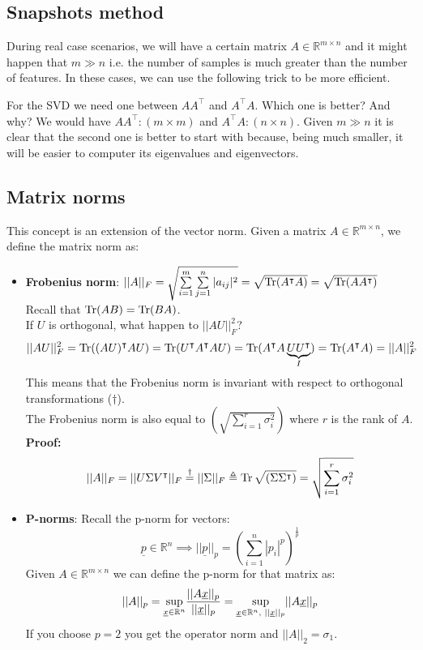 \subsection*{Snapshots method}
During real case scenarios, we will have a certain matrix $A \in \mathbb{R}^{m\times n}$ and it might happen that $m \gg n$ i.e. the number of samples is much greater than the number of features. In these cases, we can use the following trick to be more efficient.

For the SVD we need one between  $AA^\intercal$ and $A^\intercal A$. Which one is better? And why?
We would have $AA^\intercal: (m\times m)$ and $A^\intercal A: (n\times n)$. Given $m \gg n$ it is clear that the second one is better to start with because, being much smaller, it will be easier to computer its eigenvalues and eigenvectors.    


\subsection*{Matrix norms}
This concept is an extension of the vector norm. Given a matrix $A \in \mathbb{R}^{m\times n}$, we define the matrix norm as:
\begin{itemize}
    \item \textbf{Frobenius norm}: $||A||_F = \sqrt{\sum\limits_{i=1}^{m}\sum\limits_{j=1}^{n}|a_{ij}|^2} = \sqrt{\operatorname{Tr}(A^\intercal A)} = \sqrt{\operatorname{Tr}(AA^\intercal)}$ \\
    Recall that $\operatorname{Tr}(AB) = \operatorname{Tr}(BA)$. \\

    If $U$ is orthogonal, what happen to $||AU||^2_F$?
    \[
        ||AU||^2_F = \operatorname{Tr}((AU)^\intercal AU) = \operatorname{Tr}(U^\intercal A^\intercal AU) = \operatorname{Tr}(A^\intercal A\underbrace{UU^\intercal}_{I}) = \operatorname{Tr}(A^\intercal A) = ||A||^2_F    
    \]
    This means that the Frobenius norm is invariant with respect to orthogonal transformations ($\dag$). \\ 
    The Frobenius norm is also equal to $\left(\sqrt{\sum\limits_{i=1}^{r}\sigma_i^2}\right)$ where $r$ is the rank of $A$. \\
    \textbf{Proof:}
    \[
        ||A||_F = ||U\Sigma V^\intercal||_F \overset{\dag}{=} ||\Sigma||_F \triangleq  \operatorname{Tr}\sqrt{(\Sigma\Sigma^\intercal)} = \sqrt{\sum\limits_{i=1}^{r}\sigma_i^2}    
    \]
    \item \textbf{P-norms}: Recall the p-norm for vectors:
    \[
        \underline{p} \in \mathbb{R}^n \implies ||\underline{p}||_p = \left(\sum\limits_{i=1}^n |p_i|^p\right)^{\frac{1}{p}}    
    \]
    Given $A \in \mathbb{R}^{m\times n}$ we can define the p-norm for that matrix as:
    \[
        ||A||_p = \underset{\underline{x} \in \mathbb{R}^n}{\sup} \dfrac{||A\underline{x}||_p}{||\underline{x}||_p} = \underset{\underline{x} \in \mathbb{R}^n, \hspace{0.1cm} ||\underline{x}||_p}{\sup} ||A\underline{x}||_p
    \]
    If you choose $p=2$ you get the operator norm and $||A||_2 = \sigma_1$.
\end{itemize}

